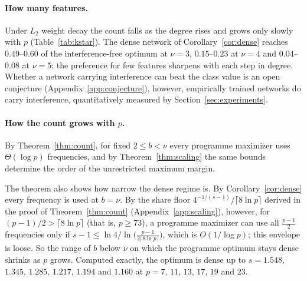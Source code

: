 \paragraph{How many features.} Under $L_2$ weight decay the count falls as the degree rises and grows only slowly with $p$ (Table~\ref{tab:kstar}). The dense network of Corollary~\ref{cor:dense} reaches $0.49$--$0.60$ of the interference-free optimum at $\nu=3$, $0.15$--$0.23$ at $\nu=4$ and $0.04$--$0.08$ at $\nu=5$: the preference for few features sharpens with each step in degree. Whether a network carrying interference can beat the class value is an open conjecture (Appendix~\ref{app:conjecture}), however, empirically trained networks do carry interference, quantitatively measured by  Section~\ref{sec:experiments}.

\paragraph{How the count grows with $p$.}
By Theorem~\ref{thm:count}, for fixed $2\le b<\nu$ every programme maximizer uses $\Theta(\log p)$ frequencies, and by Theorem~\ref{thm:scaling} the same bounds determine the order of the unrestricted maximum margin. 

The theorem also shows how narrow the dense regime is. By Corollary~\ref{cor:dense} every frequency is used at $b=\nu$. By the share floor $4^{-1/(s-1)}/\lceil8\ln p\rceil$ derived in the proof of Theorem~\ref{thm:count} (Appendix~\ref{app:scaling}), however, for $(p-1)/2>\lceil8\ln p\rceil$ (that is, $p\ge73$), a programme maximizer can use all $\frac{p-1}2$ frequencies only if $s-1\le\ln4/\ln\big(\frac{p-1}{2\lceil8\ln p\rceil}\big)$, which is $O(1/\log p)$; this envelope is loose. So the range of $b$ below $\nu$ on which the programme optimum stays dense shrinks as $p$ grows. Computed exactly, the optimum is dense up to $s=1.548$, $1.345$, $1.285$, $1.217$, $1.194$ and $1.160$ at $p=7$, $11$, $13$, $17$, $19$ and $23$.
